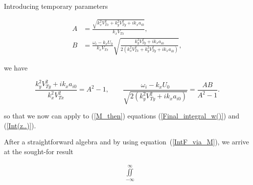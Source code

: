 \documentclass[draft]{agujournal2019}
\begin{document}
{Introducing temporary parameters
\begin{linenomath*}
\begin{subequations}
\label{AAABBB}%
\begin{align}
A  &  =\frac{\sqrt{k_{x}^{2}V_{Tx}^{2}+k_{y}^{2}V_{Ty}^{2}%
+ik_{x}a_{i0}}}{k_{x}V_{Tx}},\label{AAA}\\
B  &  =\frac{\omega_{i}-k_{x}U_{0}}{k_{x}V_{Tx}}\sqrt{\frac{k_{y}%
^{2}V_{Ty}^{2}+ik_{x}a_{i0}}{2(k_{x}^{2}V_{Tx}^{2}+k_{y}^{2}%
V_{Ty}^{2}+ik_{x}a_{i0})}}, \label{BBB}%
\end{align}
\end{subequations}
\end{linenomath*}
we have
\begin{linenomath*}
\[
\frac{k_{y}^{2}V_{Ty}^{2}+ik_{x}a_{i0}}{k_{x}^{2}V_{Tx}^{2}}%
=A^{2}-1,\qquad\frac{\omega_{i}-k_{x}U_{0}}{\sqrt{2(k_{y}^{2}V_{Ty}%
^{2}+ik_{x}a_{i0})}}=\frac{AB}{A^{2}-1}.
\]
\end{linenomath*}
so that we now can apply to (\ref{M_then}) equations (\ref{Final_integral_w()}) and (\ref{Int(z..)}).

After a straightforward algebra and by using equation~(\ref{IntF_via_M}), we
arrive at the sought-for result
\begin{linenomath*}
\begin{align}
&
{\displaystyle\iint\limits_{-\infty}^{\infty}}

\end{align}
\end{linenomath*}}
\end{document}
